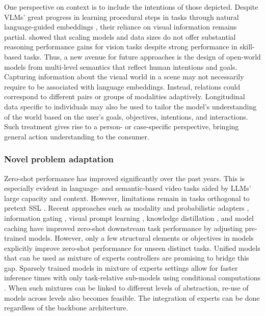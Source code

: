 One perspective on context is to include the intentions of those depicted. Despite VLMs' great progress in learning procedural steps in tasks through natural language-guided embeddings , their reliance on visual information remains partial.  showed that scaling models and data sizes do not offer substantial reasoning performance gains for vision tasks despite strong performance in skill-based tasks. Thus, a new avenue for future approaches is the design of open-world models from multi-level semantics that reflect human intentions and goals. Capturing information about the visual world in a scene may not necessarily require to be associated with language embeddings. Instead, relations could correspond to different pairs or groups of modalities adaptively. Longitudinal data specific to individuals may also be used to tailor the model's understanding of the world based on the user's goals, objectives, intentions, and interactions. Such treatment gives rise to a person- or case-specific perspective, bringing general action understanding to the consumer.



\subsubsection{Novel problem adaptation}
\label{sec:directions::reason:::novel}

Zero-shot performance has improved significantly over the past years. This is especially evident in language- and semantic-based video tasks aided by LLMs' large capacity and context. However, limitations remain in tasks orthogonal to pretext SSL . Recent approaches such as modality and probabilistic adapters , information gating , visual prompt learning , knowledge distillation , and model caching  have improved zero-shot downstream task performance by adjusting pre-trained models. However, only a few structural elements or objectives in models explicitly improve zero-shot performance for unseen distinct tasks. Unified models that can be used as mixture of experts controllers  are promising to bridge this gap. Sparsely trained models in mixture of experts settings allow for faster inference times with only task-relative sub-models using conditional computations . When such mixtures can be linked to different levels of abstraction, re-use of models across levels also becomes feasible. The integration of experts can be done regardless of the backbone architecture.




